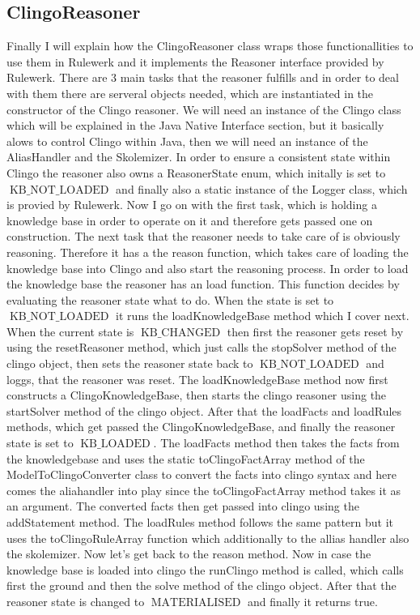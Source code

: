 \documentclass[hyperref, bachelorofscience]{cgvpub}
\begin{document}
\subsection{ClingoReasoner}
Finally I will explain how the ClingoReasoner class wraps those functionallities to use them in Rulewerk and it implements the Reasoner interface provided by Rulewerk. There are 3 main tasks that the reasoner fulfills and in order to deal with them there are serveral objects needed, which are instantiated in the constructor of the Clingo reasoner. We will need an instance of the Clingo class which will be explained in the Java Native Interface section, but it basically alows to control Clingo within Java, then we will need an instance of the AliasHandler and the Skolemizer. In order to ensure a consistent state within Clingo the reasoner also owns a ReasonerState enum, which initally is set to $\operatorname{KB\_NOT\_LOADED}$ and finally also a static instance of the Logger class, which is provied by Rulewerk.
Now I go on with the first task, which is holding a knowledge base in order to operate on it and therefore gets passed one on construction. The next task that the reasoner needs to take care of is obviously reasoning. Therefore it has a the reason function, which takes care of loading the knowledge base into Clingo and also start the reasoning process. In order to load the knowledge base the reasoner has an load function. This function decides by evaluating the reasoner state what to do. When the state is set to $\operatorname{KB\_NOT\_LOADED}$ it runs the loadKnowledgeBase method which I cover next. When the current state is $\operatorname{KB\_CHANGED}$ then first the reasoner gets reset by using the resetReasoner method, which just calls the stopSolver method of the clingo object, then sets the reasoner state back to $\operatorname{KB\_NOT\_LOADED}$ and loggs, that the reasoner was reset. The loadKnowledgeBase method now first constructs a ClingoKnowledgeBase, then starts the clingo reasoner using the startSolver method of the clingo object. After that the loadFacts and loadRules methods, which get passed the ClingoKnowledgeBase,  and finally the reasoner state is set to $\operatorname{KB\_LOADED}$.
The loadFacts method then takes the facts from the knowledgebase and uses the static toClingoFactArray method of the ModelToClingoConverter class to convert the facts into clingo syntax and here comes the aliahandler into play since the toClingoFactArray method takes it as an argument. The converted facts then get passed into clingo using the addStatement method. The loadRules method follows the same pattern but it uses the toClingoRuleArray function which additionally to the allias handler also the skolemizer. Now let's get back to the reason method. Now in case the knowledge base is loaded into clingo the runClingo method is called, which calls first the ground and then the solve method of the clingo object. After that the reasoner state is changed to $\operatorname{MATERIALISED}$ and finally it returns true.
\end{document}
